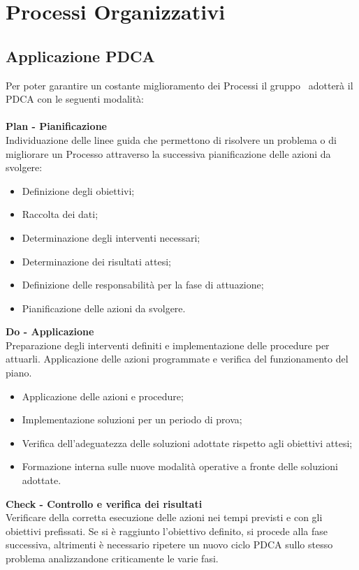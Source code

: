 \section{Processi Organizzativi}
\subsection{Applicazione PDCA}
Per poter garantire un costante miglioramento dei Processi il gruppo \gruppo\ adotterà il PDCA con le seguenti modalità:\\\\
\textbf{Plan - Pianificazione}\\
Individuazione delle linee guida che permettono di risolvere un problema o di migliorare un Processo attraverso la successiva pianificazione delle azioni da svolgere:
\begin{itemize}
\item Definizione degli obiettivi;
\item Raccolta dei dati;
\item Determinazione degli interventi necessari;
\item Determinazione dei risultati attesi;
\item Definizione delle responsabilità per la fase di attuazione;
\item Pianificazione delle azioni da svolgere.
\end{itemize}
\textbf{Do - Applicazione}\\
Preparazione degli interventi definiti e implementazione delle procedure per attuarli. Applicazione delle azioni programmate e verifica del funzionamento del piano.
\begin{itemize}
\item Applicazione delle azioni e procedure;
\item Implementazione soluzioni per un periodo di prova;
\item Verifica dell'adeguatezza delle soluzioni adottate rispetto agli obiettivi attesi;
\item Formazione interna sulle nuove modalità operative a fronte delle soluzioni adottate.\\
\end{itemize}
\textbf{Check - Controllo e verifica dei risultati}\\
Verificare della corretta esecuzione delle azioni nei tempi previsti e con gli obiettivi prefissati.
Se si è raggiunto l’obiettivo definito, si procede alla fase successiva, altrimenti è necessario ripetere un nuovo ciclo PDCA sullo stesso problema analizzandone criticamente le varie fasi.
